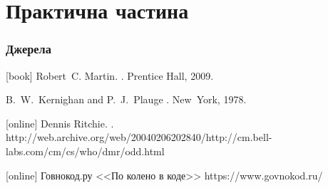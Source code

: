 \documentclass[12pt,pdf,utf8,ukrainian,aspectratio=169]{beamer}
\makeatletter
\newcommand*{\currentname}{\@currentlabelname}
\makeatother
\begin{document}
	\section{Практична частина}
	\begin{frame}\frametitle{\currentname}
		
	\end{frame}

	\begin{frame}[allowframebreaks]
		\frametitle<presentation>{Джерела}    
		\begin{thebibliography}{10}    
			[book]
			Robert~C. Martin.
			.
			\newblock Prentice Hall, 2009.
			
			B.~W.~Kernighan and P.~J.~Plauge
			.
			\newblock New~York, 1978.
			
			Dennis Ritchie.
			.
			\newblock http://web.archive.org/web/20040206202840/http://cm.bell-labs.com/cm/cs/who/dmr/odd.html
			
			Говнокод.ру	
			\newblock <<По колено в коде>> https://www.govnokod.ru/
		\end{thebibliography}
	\end{frame}	
\end{document}
